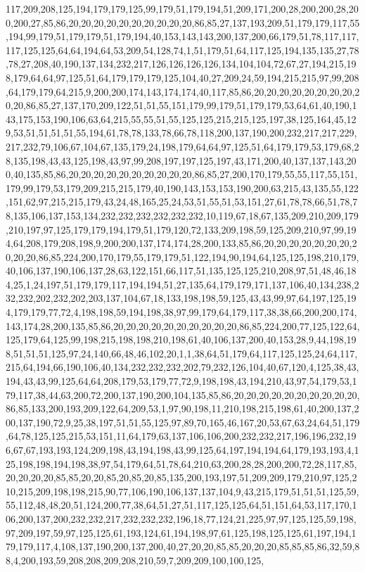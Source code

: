 117,209,208,125,194,179,179,125,99,179,51,179,194,51,209,171,200,28,200,200,28,200,200,27,85,86,20,20,20,20,20,20,20,20,20,20,86,85,27,137,193,209,51,179,179,117,55,194,99,179,51,179,179,51,179,194,40,153,143,143,200,137,200,66,179,51,78,117,117,117,125,125,64,64,194,64,53,209,54,128,74,1,51,179,51,64,117,125,194,135,135,27,78,78,27,208,40,190,137,134,232,217,126,126,126,126,134,104,104,72,67,27,194,215,198,179,64,64,97,125,51,64,179,179,179,125,104,40,27,209,24,59,194,215,215,97,99,208,64,179,179,64,215,9,200,200,174,143,174,174,40,117,85,86,20,20,20,20,20,20,20,20,20,20,86,85,27,137,170,209,122,51,51,55,151,179,99,179,51,179,179,53,64,61,40,190,143,175,153,190,106,63,64,215,55,55,51,55,125,125,215,215,125,197,38,125,164,45,129,53,51,51,51,51,55,194,61,78,78,133,78,66,78,118,200,137,190,200,232,217,217,229,217,232,79,106,67,104,67,135,179,24,198,179,64,64,97,125,51,64,179,179,53,179,68,28,135,198,43,43,125,198,43,97,99,208,197,197,125,197,43,171,200,40,137,137,143,200,40,135,85,86,20,20,20,20,20,20,20,20,20,20,86,85,27,200,170,179,55,55,117,55,151,179,99,179,53,179,209,215,215,179,40,190,143,153,153,190,200,63,215,43,135,55,122,151,62,97,215,215,179,43,24,48,165,25,24,53,51,55,51,53,151,27,61,78,78,66,51,78,78,135,106,137,153,134,232,232,232,232,232,232,10,119,67,18,67,135,209,210,209,179,210,197,97,125,179,179,194,179,51,179,120,72,133,209,198,59,125,209,210,97,99,194,64,208,179,208,198,9,200,200,137,174,174,28,200,133,85,86,20,20,20,20,20,20,20,20,20,20,86,85,224,200,170,179,55,179,179,51,122,194,90,194,64,125,125,198,210,179,40,106,137,190,106,137,28,63,122,151,66,117,51,135,125,125,210,208,97,51,48,46,184,25,1,24,197,51,179,179,117,194,194,51,27,135,64,179,179,171,137,106,40,134,238,232,232,202,232,202,203,137,104,67,18,133,198,198,59,125,43,43,99,97,64,197,125,194,179,179,77,72,4,198,198,59,194,198,38,97,99,179,64,179,117,38,38,66,200,200,174,143,174,28,200,135,85,86,20,20,20,20,20,20,20,20,20,20,86,85,224,200,77,125,122,64,125,179,64,125,99,198,215,198,198,210,198,61,40,106,137,200,40,153,28,9,44,198,198,51,51,51,125,97,24,140,66,48,46,102,20,1,1,38,64,51,179,64,117,125,125,24,64,117,215,64,194,66,190,106,40,134,232,232,232,202,79,232,126,104,40,67,120,4,125,38,43,194,43,43,99,125,64,64,208,179,53,179,77,72,9,198,198,43,194,210,43,97,54,179,53,179,117,38,44,63,200,72,200,137,190,200,104,135,85,86,20,20,20,20,20,20,20,20,20,20,86,85,133,200,193,209,122,64,209,53,1,97,90,198,11,210,198,215,198,61,40,200,137,200,137,190,72,9,25,38,197,51,51,55,125,97,89,70,165,46,167,20,53,67,63,24,64,51,179,64,78,125,125,215,53,151,11,64,179,63,137,106,106,200,232,232,217,196,196,232,196,67,67,193,193,124,209,198,43,194,198,43,99,125,64,197,194,194,64,179,193,193,4,125,198,198,194,198,38,97,54,179,64,51,78,64,210,63,200,28,28,200,200,72,28,117,85,20,20,20,20,85,85,20,20,85,20,85,20,85,135,200,193,197,51,209,209,179,210,97,125,210,215,209,198,198,215,90,77,106,190,106,137,137,104,9,43,215,179,51,51,51,125,59,55,112,48,48,20,51,124,200,77,38,64,51,27,51,117,125,125,64,51,151,64,53,117,170,106,200,137,200,232,232,217,232,232,232,196,18,77,124,21,225,97,97,125,125,59,198,97,209,197,59,97,125,125,61,193,124,61,194,198,97,61,125,198,125,125,61,197,194,179,179,117,4,108,137,190,200,137,200,40,27,20,20,85,85,20,20,20,85,85,85,86,32,59,88,4,200,193,59,208,208,209,208,210,59,7,209,209,100,100,125,